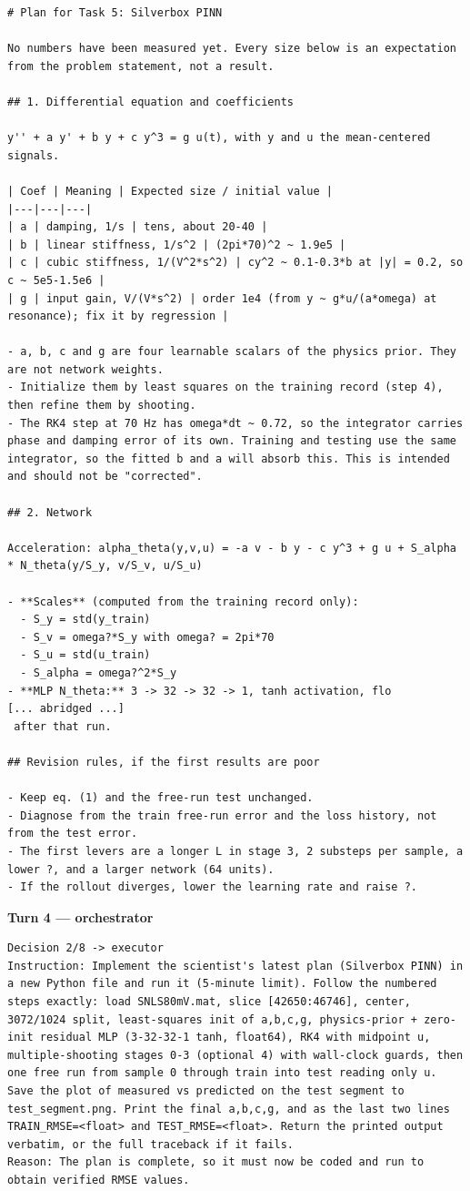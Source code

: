 \begin{lstlisting}
# Plan for Task 5: Silverbox PINN

No numbers have been measured yet. Every size below is an expectation from the problem statement, not a result.

## 1. Differential equation and coefficients

y'' + a y' + b y + c y^3 = g u(t), with y and u the mean-centered signals.

| Coef | Meaning | Expected size / initial value |
|---|---|---|
| a | damping, 1/s | tens, about 20-40 |
| b | linear stiffness, 1/s^2 | (2pi*70)^2 ~ 1.9e5 |
| c | cubic stiffness, 1/(V^2*s^2) | cy^2 ~ 0.1-0.3*b at |y| = 0.2, so c ~ 5e5-1.5e6 |
| g | input gain, V/(V*s^2) | order 1e4 (from y ~ g*u/(a*omega) at resonance); fix it by regression |

- a, b, c and g are four learnable scalars of the physics prior. They are not network weights.
- Initialize them by least squares on the training record (step 4), then refine them by shooting.
- The RK4 step at 70 Hz has omega*dt ~ 0.72, so the integrator carries phase and damping error of its own. Training and testing use the same integrator, so the fitted b and a will absorb this. This is intended and should not be "corrected".

## 2. Network

Acceleration: alpha_theta(y,v,u) = -a v - b y - c y^3 + g u + S_alpha * N_theta(y/S_y, v/S_v, u/S_u)

- **Scales** (computed from the training record only):
  - S_y = std(y_train)
  - S_v = omega?*S_y with omega? = 2pi*70
  - S_u = std(u_train)
  - S_alpha = omega?^2*S_y
- **MLP N_theta:** 3 -> 32 -> 32 -> 1, tanh activation, flo
[... abridged ...]
 after that run.

## Revision rules, if the first results are poor

- Keep eq. (1) and the free-run test unchanged.
- Diagnose from the train free-run error and the loss history, not from the test error.
- The first levers are a longer L in stage 3, 2 substeps per sample, a lower ?, and a larger network (64 units).
- If the rollout diverges, lower the learning rate and raise ?.
\end{lstlisting}
\noindent\textbf{Turn 4 --- orchestrator}
\begin{lstlisting}
Decision 2/8 -> executor
Instruction: Implement the scientist's latest plan (Silverbox PINN) in a new Python file and run it (5-minute limit). Follow the numbered steps exactly: load SNLS80mV.mat, slice [42650:46746], center, 3072/1024 split, least-squares init of a,b,c,g, physics-prior + zero-init residual MLP (3-32-32-1 tanh, float64), RK4 with midpoint u, multiple-shooting stages 0-3 (optional 4) with wall-clock guards, then one free run from sample 0 through train into test reading only u. Save the plot of measured vs predicted on the test segment to test_segment.png. Print the final a,b,c,g, and as the last two lines TRAIN_RMSE=<float> and TEST_RMSE=<float>. Return the printed output verbatim, or the full traceback if it fails.
Reason: The plan is complete, so it must now be coded and run to obtain verified RMSE values.
\end{lstlisting}
